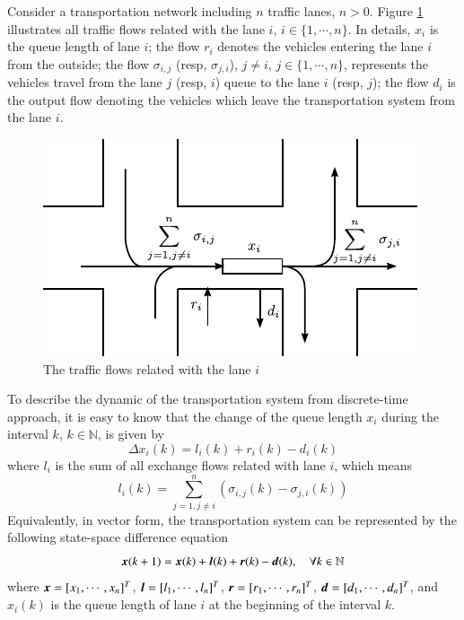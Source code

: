 \documentclass[preprint,authoryear,12pt]{elsarticle}
\renewcommand{\vec}[1]{\mbox{\boldmath$#1$}}
\begin{document}
Consider a transportation network including $n$ traffic lanes, $n>0$.
Figure \ref{fig:flows} illustrates all traffic flows related with the
lane $i$, $i\in\{1,\cdots,n\}$. In details, $x_i$ is the queue length
of lane $i$; the flow $r_i$ denotes the vehicles entering the lane
$i$ from the outside; the flow $\sigma_{i,j}$ (resp, $\sigma_{j,i}$),
$j\neq i$, $j\in\{1,\cdots,n\}$, represents the vehicles travel from
the lane $j$ (resp, $i$) queue to the lane $i$ (resp, $j$); the flow
$d_{i}$ is the output flow denoting the vehicles which leave the
transportation system from the lane $i$.

\begin{figure}[ht]
  \centering
  \includegraphics{pics/flows}
  \caption{The traffic flows related with the lane $i$}
  \label{fig:flows}
\end{figure}

To describe the dynamic of the transportation system from
discrete-time approach, it is easy to know that the change of the
queue length $x_i$ during the interval $k$, $k\in\mathbb{N}$, is
given by
\begin{equation}\label{equ:mdl_gnl_lane}
\Delta x_i(k) = l_i(k)+r_i(k)-d_i(k)
\end{equation}
where $l_i$ is the sum of all exchange flows related with lane $i$,
which means
$$l_i(k)=\sum_{j=1,j\neq i}^{n}(\sigma_{i,j}(k)-\sigma_{j,i}(k))$$
Equivalently, in vector form, the transportation system can be
represented by the following state-space difference equation
\begin{equation}\label{equ:mdl_gnl}
\vec{x}(k+1)=\vec{x}(k)+\vec{l}(k)+\vec{r}(k)-\vec{d}(k),\quad \forall
k\in\mathbb{N}
\end{equation}
where $\vec{x}=[x_1,\cdots,x_n]^T$, $\vec{l}=[l_1,\cdots,l_n]^T$,
$\vec{r}=[r_1,\cdots,r_n]^T$, $\vec{d}=[d_1,\cdots,d_n]^T$, and
$x_i(k)$ is the queue length of lane $i$ at the beginning of the
interval $k$.
\end{document}
